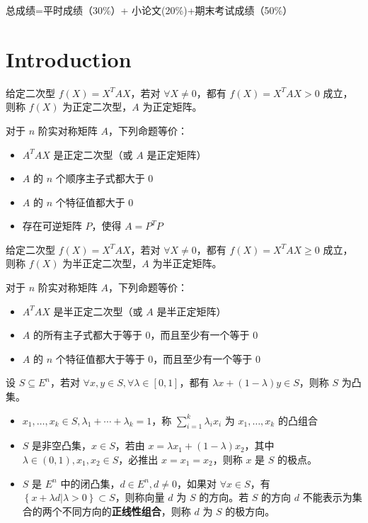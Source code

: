 

\newcommand\Title{最优化方法笔记}
\renewcommand\due{due: 16 weeks}
\newcommand\tr{\operatorname{tr}}
\newtheorem*{theorem}{定理}




总成绩=平时成绩（30\%）+ 小论文(20\%)+期末考试成绩（50\%）
\section{Introduction}
\begin{remark}
    给定二次型 $f(X) = X^T AX$，若对 $\forall X \neq 0$，都有 $f(X) = X^T AX > 0$ 成立，则称 $f(X)$ 为正定二次型，$A$ 为正定矩阵。

    对于 $n$ 阶实对称矩阵 $A$，下列命题等价：
    \begin{itemize}
        \item $A^T AX$ 是正定二次型（或 $A$ 是正定矩阵）
        \item $A$ 的 $n$ 个顺序主子式都大于 0
        \item $A$ 的 $n$ 个特征值都大于 0
        \item 存在可逆矩阵 $P$，使得 $A = P^T P$
    \end{itemize}
\end{remark}

\begin{remark}
    给定二次型 $f(X) = X^T AX$，若对 $\forall X \neq 0$，都有 $f(X) = X^T AX \ge 0$ 成立，则称 $f(X)$ 为半正定二次型，$A$ 为半正定矩阵。

    对于 $n$ 阶实对称矩阵 $A$，下列命题等价：
    \begin{itemize}
        \item $A^T AX$ 是半正定二次型（或 $A$ 是半正定矩阵）
        \item $A$ 的所有主子式都大于等于 0，而且至少有一个等于 0
        \item $A$ 的 $n$ 个特征值都大于等于 0，而且至少有一个等于 0
    \end{itemize}
\end{remark}

\begin{remark}
    设 $S \subseteq E^n$，若对 $\forall x, y \in S, \forall \lambda \in [0, 1]$，都有 $\lambda x + (1 - \lambda)y \in S$，则称 $S$ 为凸集。
    \begin{itemize}
        \item $x_1, \dots, x_k \in S, \lambda_1 + \cdots + \lambda_k = 1$，称 $\sum_{i = 1}^k \lambda_ix_i$ 为 $x_1, \dots, x_k$ 的凸组合
        \item $S$ 是非空凸集，$x\in S$，若由 $x = \lambda x_1 + (1 - \lambda)x_2$，其中 $\lambda \in (0, 1), x_1, x_2 \in S$，必推出 $x = x_1 = x_2$，则称 $x$ 是 $S$ 的极点。
        \item $S$ 是 $E^n$ 中的闭凸集，$d \in E^n, d \neq 0$，如果对 $\forall x \in S$，有 $\left\{x + \lambda d | \lambda > 0\right\} \subset S$，则称向量 $d$ 为 $S$ 的方向。若 $S$ 的方向 $d$ 不能表示为集合的两个不同方向的\textbf{正线性组合}，则称 $d$ 为 $S$ 的极方向。
    \end{itemize}
\end{remark}

